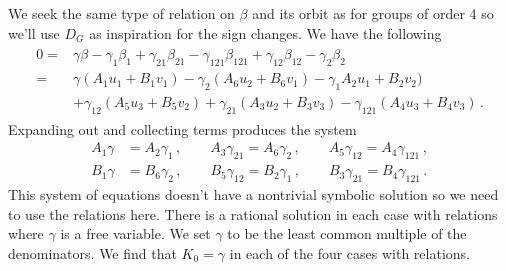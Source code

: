 We seek the same type of relation on $\beta$ and its orbit as for groups of order 4 so we'll use $D_G$ as inspiration for the sign changes. We have the following
\begin{align}\begin{split}
0=&\gamma\beta-\gamma_{1}\beta_{1}+\gamma_{21}\beta_{21}-\gamma_{121}\beta_{121}+\gamma_{12}\beta_{12}-\gamma_{2}\beta_{2}\\
	=&\gamma (A_1 u_1 + B_1 v_1) - \gamma_{2} (A_6 u_2 + B_6 v_1) - \gamma_{1} A_2 u_1 + B_2 v_2) \\&+  \gamma_{12} (A_5 u_3 + B_5 v_2) + \gamma_{21}(A_3 u_2 + B_3 v_3) - \gamma_{121} (A_4 u_3 + B_4 v_3)\,.
\end{split}\end{align}
Expanding out and collecting terms produces the system
\begin{align}
	 A_1 \gamma&= A_2 \gamma_{1}\,,\quad   \quad A_3 \gamma_{21} = A_6 \gamma_{2}\,,\quad \quad A_5 \gamma_{12} = A_4 \gamma_{121}\,,\\
	 B_1 \gamma &= B_6\gamma_{2}\,,\quad  \quad  B_5 \gamma_{12}= B_2 \gamma_{1}\,,\quad  \quad B_3 \gamma_{21} = B_4 \gamma_{121}\,.
\end{align}
This system of equations doesn't have a nontrivial symbolic solution so we need to use the relations here. There is a rational solution in each case with relations where $\gamma$ is a free variable. We set $\gamma$ to be the least common multiple of the denominators. We find that $K_0 = \gamma$ in each of the four cases with relations.

